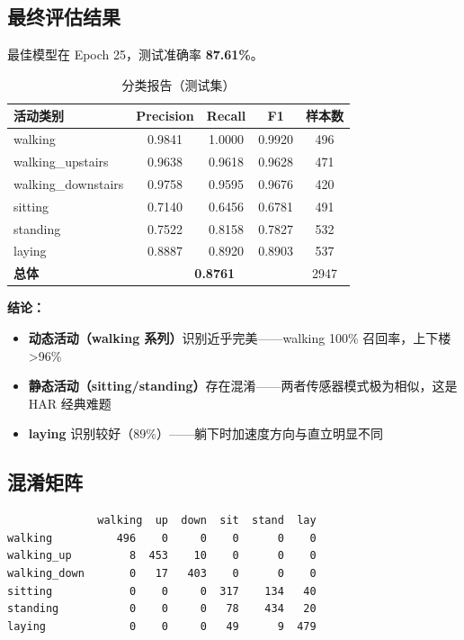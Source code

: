\documentclass[12pt,a4paper]{ctexart}
\begin{document}
\subsection{最终评估结果}

最佳模型在 Epoch 25，测试准确率 \textbf{87.61\%}。

\begin{table}[h]
\centering
\begin{tabular}{@{}lcccc@{}}
\toprule
\textbf{活动类别} & \textbf{Precision} & \textbf{Recall} & \textbf{F1} & \textbf{样本数} \\
\midrule
walking            & 0.9841 & 1.0000 & 0.9920 & 496 \\
walking\_upstairs   & 0.9638 & 0.9618 & 0.9628 & 471 \\
walking\_downstairs & 0.9758 & 0.9595 & 0.9676 & 420 \\
sitting            & 0.7140 & 0.6456 & 0.6781 & 491 \\
standing           & 0.7522 & 0.8158 & 0.7827 & 532 \\
laying             & 0.8887 & 0.8920 & 0.8903 & 537 \\
\midrule
\textbf{总体}      & \multicolumn{3}{c}{\textbf{0.8761}} & 2947 \\
\bottomrule
\end{tabular}
\caption{分类报告（测试集）}
\end{table}

\textbf{结论：}
\begin{itemize}
    \item \textbf{动态活动（walking 系列）}识别近乎完美——walking 100\% 召回率，上下楼 >96\%
    \item \textbf{静态活动（sitting/standing）}存在混淆——两者传感器模式极为相似，这是 HAR 经典难题
    \item \textbf{laying} 识别较好（89\%）——躺下时加速度方向与直立明显不同
\end{itemize}

\subsection{混淆矩阵}

\begin{verbatim}
              walking  up  down  sit  stand  lay
walking          496    0     0    0      0    0
walking_up         8  453    10    0      0    0
walking_down       0   17   403    0      0    0
sitting            0    0     0  317    134   40
standing           0    0     0   78    434   20
laying             0    0     0   49      9  479
\end{verbatim}
\end{document}
